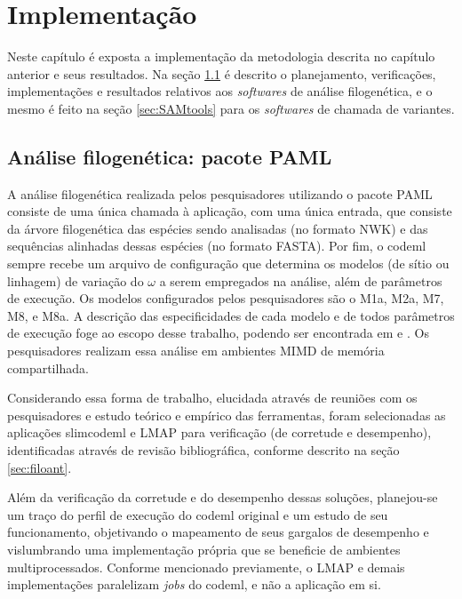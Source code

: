 \documentclass[cic,tc]{iiufrgs}
\begin{document}
%
%
%
%
\chapter{Implementação}
\label{chap:imp}

Neste capítulo é exposta a implementação da metodologia descrita no capítulo
anterior e seus resultados. Na seção \ref{sec:filomp} é descrito o
planejamento, verificações, implementações e resultados relativos aos \textit{softwares}
de análise filogenética, e o mesmo é feito na seção \ref{sec:SAMtools} para os
\textit{softwares} de chamada de variantes.

\section{Análise filogenética: pacote PAML}
\label{sec:filomp}

A análise filogenética realizada pelos pesquisadores utilizando o pacote PAML
consiste de uma única chamada à aplicação, com uma única entrada, que consiste
da árvore filogenética das espécies sendo analisadas (no formato NWK) e das
sequências alinhadas dessas espécies (no formato FASTA). Por fim, o codeml
sempre recebe um arquivo de configuração que determina os modelos (de sítio ou
linhagem) de variação do $\omega$ a serem empregados na análise, além de
parâmetros de execução. Os modelos configurados pelos pesquisadores são o M1a,
M2a, M7, M8, e M8a. A descrição das especificidades de cada modelo e de todos
parâmetros de execução foge ao escopo desse trabalho, podendo ser encontrada em
\cite{yang2000codon} e \cite{zhang2005evaluation}. Os pesquisadores realizam
essa análise em ambientes MIMD de memória compartilhada.

Considerando essa forma de trabalho, elucidada através de reuniões com os
pesquisadores e estudo teórico e empírico das ferramentas, foram selecionadas
as aplicações slimcodeml e LMAP para verificação (de corretude e desempenho),
identificadas através de revisão bibliográfica, conforme descrito na seção
\ref{sec:filoant}.

Além da verificação da corretude e do desempenho dessas soluções, planejou-se
um traço do perfil de execução do codeml original e um estudo de seu
funcionamento, objetivando o mapeamento de seus gargalos de desempenho e
vislumbrando uma implementação própria que se beneficie de ambientes
multiprocessados. Conforme mencionado previamente, o LMAP e demais
implementações paralelizam \textit{jobs} do codeml, e não a aplicação em si. 
\end{document}
